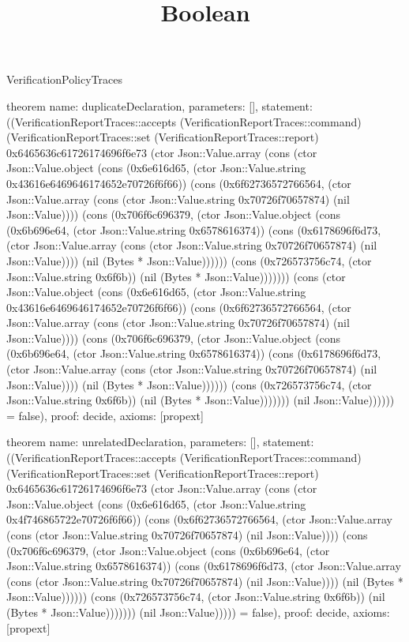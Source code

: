 \begin{lexlean}{VerificationPolicyTraces}
\title{Boolean}
\begin{semanticmodule}

theorem{
  name: duplicateDeclaration,
  parameters: [],
  statement: ((VerificationReportTraces::accepts (VerificationReportTraces::command) (VerificationReportTraces::set (VerificationReportTraces::report) 0x6465636c61726174696f6e73 (ctor Json::Value.array (cons (ctor Json::Value.object (cons (0x6e616d65, (ctor Json::Value.string 0x43616e6469646174652e70726f6f66)) (cons (0x6f62736572766564, (ctor Json::Value.array (cons (ctor Json::Value.string 0x70726f70657874) (nil Json::Value)))) (cons (0x706f6c696379, (ctor Json::Value.object (cons (0x6b696e64, (ctor Json::Value.string 0x6578616374)) (cons (0x6178696f6d73, (ctor Json::Value.array (cons (ctor Json::Value.string 0x70726f70657874) (nil Json::Value)))) (nil (Bytes * Json::Value)))))) (cons (0x726573756c74, (ctor Json::Value.string 0x6f6b)) (nil (Bytes * Json::Value))))))) (cons (ctor Json::Value.object (cons (0x6e616d65, (ctor Json::Value.string 0x43616e6469646174652e70726f6f66)) (cons (0x6f62736572766564, (ctor Json::Value.array (cons (ctor Json::Value.string 0x70726f70657874) (nil Json::Value)))) (cons (0x706f6c696379, (ctor Json::Value.object (cons (0x6b696e64, (ctor Json::Value.string 0x6578616374)) (cons (0x6178696f6d73, (ctor Json::Value.array (cons (ctor Json::Value.string 0x70726f70657874) (nil Json::Value)))) (nil (Bytes * Json::Value)))))) (cons (0x726573756c74, (ctor Json::Value.string 0x6f6b)) (nil (Bytes * Json::Value))))))) (nil Json::Value)))))) = false),
  proof: decide{},
  axioms: [propext]
}

theorem{
  name: unrelatedDeclaration,
  parameters: [],
  statement: ((VerificationReportTraces::accepts (VerificationReportTraces::command) (VerificationReportTraces::set (VerificationReportTraces::report) 0x6465636c61726174696f6e73 (ctor Json::Value.array (cons (ctor Json::Value.object (cons (0x6e616d65, (ctor Json::Value.string 0x4f746865722e70726f6f66)) (cons (0x6f62736572766564, (ctor Json::Value.array (cons (ctor Json::Value.string 0x70726f70657874) (nil Json::Value)))) (cons (0x706f6c696379, (ctor Json::Value.object (cons (0x6b696e64, (ctor Json::Value.string 0x6578616374)) (cons (0x6178696f6d73, (ctor Json::Value.array (cons (ctor Json::Value.string 0x70726f70657874) (nil Json::Value)))) (nil (Bytes * Json::Value)))))) (cons (0x726573756c74, (ctor Json::Value.string 0x6f6b)) (nil (Bytes * Json::Value))))))) (nil Json::Value))))) = false),
  proof: decide{},
  axioms: [propext]
}


\end{semanticmodule}
\end{lexlean}
